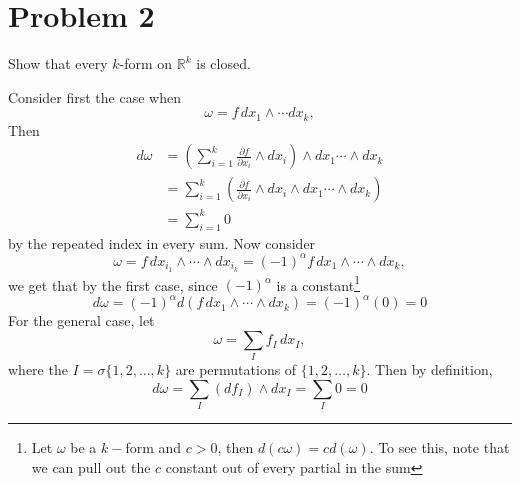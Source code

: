 \documentclass[11pt]{article}
\begin{document}
\newpage
\section*{Problem 2}
Show that every $k$-form on $\mathbb{R}^k$ is closed.
\begin{solution}
    Consider first the case when 
    \[\omega = f \,dx_1\wedge \cdots dx_k,\] Then
    \begin{align*}
        d\omega &= \left(\sum_{i=1}^k \frac{\partial f}{\partial x_i}\wedge dx_i\right) \wedge dx_1 \cdots \wedge dx_k\\
        &= \sum_{i=1}^k \left(\frac{\partial f}{\partial x_i}\wedge dx_i \wedge dx_1 \cdots \wedge dx_k\right)\\
        &= \sum_{i=1}^k 0
    \end{align*}
    by the repeated index in every sum. Now consider 
    \[\omega = f\,dx_{i_1}\wedge \cdots \wedge dx_{i_k} = (-1)^\alpha f \,dx_1 \wedge \cdots \wedge dx_k,\] we get that by the first case, since $(-1)^\alpha$ is a constant\footnote{Let $\omega$ be a $k-$form and $c>0$, then $d(c\omega) = cd(\omega)$. To see this, note that we can pull out the $c$ constant out of every partial in the sum}
    \[d\omega = (-1)^\alpha d\left(f \,dx_1 \wedge \cdots \wedge dx_k\right) = (-1)^\alpha (0) = 0\]
    For the general case, let 
    \[\omega = \sum_I f_I \,dx_I,\] where the $I = \sigma\{1,2,\dots, k\}$ are permutations of $\{1,2,\dots, k\}.$ Then by definition,
    \[d \omega = \sum_I (df_I)\wedge dx_I = \sum_I 0 = 0\]

\end{solution}

\newpage
\end{document}
